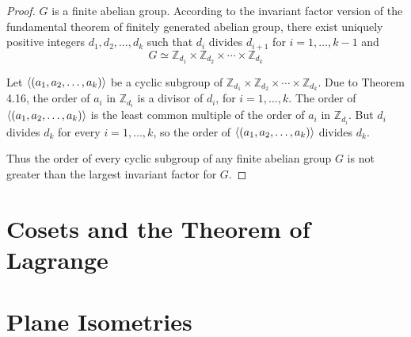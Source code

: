 \begin{proof}
    $G$ is a finite abelian group. According to the invariant factor version of the fundamental theorem of finitely generated abelian group, there exist uniquely positive integers $d_{1}, d_{2}, \ldots, d_{k}$ such that $d_{i}$ divides $d_{i+1}$ for $i = 1,\ldots,k-1$ and
    \[
        G \simeq \mathbb{Z}_{d_{1}} \times \mathbb{Z}_{d_{2}} \times \cdots \times \mathbb{Z}_{d_{k}}
    \]

    Let $\left\langle{(a_{1}, a_{2}, \ldots, a_{k})}\right\rangle$ be a cyclic subgroup of $\mathbb{Z}_{d_{1}} \times \mathbb{Z}_{d_{2}} \times \cdots \times \mathbb{Z}_{d_{k}}$. Due to Theorem 4.16, the order of $a_{i}$ in $\mathbb{Z}_{d_{i}}$ is a divisor of $d_{i}$, for $i = 1,\ldots, k$. The order of $\left\langle{(a_{1}, a_{2}, \ldots, a_{k})}\right\rangle$ is the least common multiple of the order of $a_{i}$ in $\mathbb{Z}_{d_{i}}$. But $d_{i}$ divides $d_{k}$ for every $i = 1,\ldots, k$, so the order of $\left\langle{(a_{1}, a_{2}, \ldots, a_{k})}\right\rangle$ divides $d_{k}$.

    Thus the order of every cyclic subgroup of any finite abelian group $G$ is not greater than the largest invariant factor for $G$.
\end{proof}

\section{Cosets and the Theorem of Lagrange}



\section{Plane Isometries}
